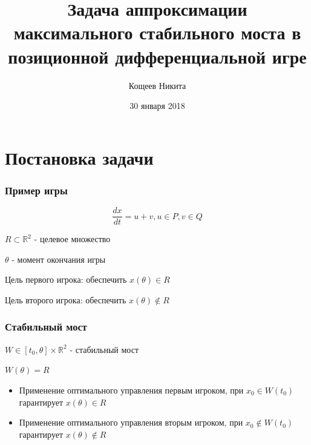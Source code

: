 \documentclass{beamer}
\title[ОТЧЕТ по производственной  практике]{Задача аппроксимации максимального стабильного моста в позиционной дифференциальной игре}
\author{Кощеев Никита}
\institute[УрФУ]{Институт естественных наук и математики}
\date{30 января 2018}
\newcommand{\dimension}{\mathbb{R}^2}
\begin{document}
  
  \begin{frame}
      
    \titlepage 
    
  \end{frame}
  
  
  
  \section{Постановка задачи} 

  \begin{frame}
    \frametitle{Пример игры}
  
    \begin{equation}
        \frac{dx}{dt} = u + v, u \in P, v \in Q
    \end{equation}

    $R \subset \dimension$ - целевое множество 
    \vspace{5mm}
  
    $\theta$ - момент окончания игры

    Цель первого игрока: обеспечить $x(\theta) \in R$

    Цель второго игрока: обеспечить $x(\theta) \notin R$

  \end{frame}
  
  
  \begin{frame}
    \frametitle{Стабильный мост}

    $W \in [t_0, \theta] \times \dimension$ - стабильный мост

    $W(\theta)=R$

    \begin{itemize}
      \item Применение оптимального управления первым игроком,
      при $x_0 \in W(t_0)$ гарантирует $x(\theta) \in R$
      \item Применение оптимального управления вторым игроком,
      при $x_0 \notin W(t_0)$ гарантирует $x(\theta) \notin R$
    \end{itemize}

  \end{frame}
  
\end{document}
